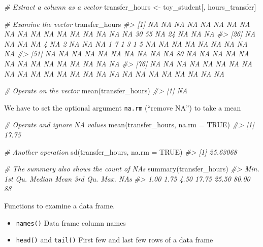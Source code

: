 \documentclass[
]{book}
\newenvironment{Shaded}{\begin{snugshade}}{\end{snugshade}}
\newcommand{\AttributeTok}[1]{\textcolor[rgb]{0.77,0.63,0.00}{#1}}
\newcommand{\CommentTok}[1]{\textcolor[rgb]{0.56,0.35,0.01}{\textit{#1}}}
\newcommand{\ConstantTok}[1]{\textcolor[rgb]{0.00,0.00,0.00}{#1}}
\newcommand{\FunctionTok}[1]{\textcolor[rgb]{0.00,0.00,0.00}{#1}}
\newcommand{\NormalTok}[1]{#1}
\newcommand{\OtherTok}[1]{\textcolor[rgb]{0.56,0.35,0.01}{#1}}
\providecommand{\tightlist}{%
  \setlength{\itemsep}{0pt}\setlength{\parskip}{0pt}}
\begin{document}
\begin{Shaded}
\begin{Highlighting}[]
\CommentTok{\# Extract a column as a vector}
\NormalTok{transfer\_hours }\OtherTok{\textless{}{-}}\NormalTok{ toy\_student[, hours\_transfer]}

\CommentTok{\# Examine the vector}
\NormalTok{transfer\_hours}
\CommentTok{\#\textgreater{}   [1] NA NA NA NA NA NA NA NA NA NA NA NA NA NA NA NA NA NA 30 55 NA 24 NA NA NA}
\CommentTok{\#\textgreater{}  [26] NA NA NA NA  4 NA  2 NA NA NA  1  7  1  3  1  5 NA NA NA NA NA NA NA NA NA}
\CommentTok{\#\textgreater{}  [51] NA NA NA NA NA NA NA NA NA NA 80 NA NA NA NA NA NA NA NA NA NA NA NA NA NA}
\CommentTok{\#\textgreater{}  [76] NA NA NA NA NA NA NA NA NA NA NA NA NA NA NA NA NA NA NA NA NA NA NA NA NA}

\CommentTok{\# Operate on the vector}
\FunctionTok{mean}\NormalTok{(transfer\_hours)}
\CommentTok{\#\textgreater{} [1] NA}
\end{Highlighting}
\end{Shaded}

We have to set the optional argument \texttt{na.rm} (``remove NA'') to take a mean

\begin{Shaded}
\begin{Highlighting}[]
\CommentTok{\# Operate and ignore NA values}
\FunctionTok{mean}\NormalTok{(transfer\_hours, }\AttributeTok{na.rm =} \ConstantTok{TRUE}\NormalTok{)}
\CommentTok{\#\textgreater{} [1] 17.75}

\CommentTok{\# Another operation }
\FunctionTok{sd}\NormalTok{(transfer\_hours, }\AttributeTok{na.rm =} \ConstantTok{TRUE}\NormalTok{)}
\CommentTok{\#\textgreater{} [1] 25.63068}

\CommentTok{\# The summary also shows the count of NAs}
\FunctionTok{summary}\NormalTok{(transfer\_hours)}
\CommentTok{\#\textgreater{}    Min. 1st Qu.  Median    Mean 3rd Qu.    Max.    NA\textquotesingle{}s }
\CommentTok{\#\textgreater{}    1.00    1.75    4.50   17.75   25.50   80.00      88}
\end{Highlighting}
\end{Shaded}

Functions to examine a data frame.

\begin{itemize}
\tightlist
\item
  \texttt{names()} Data frame column names
\item
  \texttt{head()} and \texttt{tail()} First few and last few rows of a data frame
\end{itemize}
\end{document}
